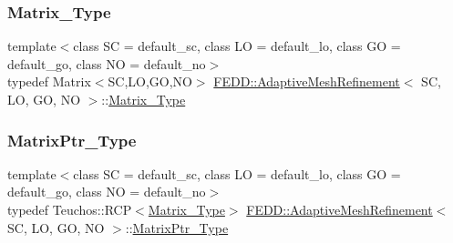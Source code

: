 \mbox{\label{classFEDD_1_1AdaptiveMeshRefinement_a607791df1d84bc4ea9fc08acd31225c7}} 
\subsubsection{\texorpdfstring{Matrix\+\_\+\+Type}{Matrix\_Type}}
{\footnotesize\ttfamily template$<$class SC = default\+\_\+sc, class LO = default\+\_\+lo, class GO = default\+\_\+go, class NO = default\+\_\+no$>$ \\
typedef Matrix$<$SC,LO,GO,NO$>$ \hyperlink{classFEDD_1_1AdaptiveMeshRefinement}{F\+E\+D\+D\+::\+Adaptive\+Mesh\+Refinement}$<$ SC, LO, GO, NO $>$\+::\hyperlink{classFEDD_1_1AdaptiveMeshRefinement_a607791df1d84bc4ea9fc08acd31225c7}{Matrix\+\_\+\+Type}}

\mbox{\label{classFEDD_1_1AdaptiveMeshRefinement_a862a72ab4878d57a61b746f5ac8d0b6c}} 
\subsubsection{\texorpdfstring{Matrix\+Ptr\+\_\+\+Type}{MatrixPtr\_Type}}
{\footnotesize\ttfamily template$<$class SC = default\+\_\+sc, class LO = default\+\_\+lo, class GO = default\+\_\+go, class NO = default\+\_\+no$>$ \\
typedef Teuchos\+::\+R\+CP$<$\hyperlink{classFEDD_1_1AdaptiveMeshRefinement_a607791df1d84bc4ea9fc08acd31225c7}{Matrix\+\_\+\+Type}$>$ \hyperlink{classFEDD_1_1AdaptiveMeshRefinement}{F\+E\+D\+D\+::\+Adaptive\+Mesh\+Refinement}$<$ SC, LO, GO, NO $>$\+::\hyperlink{classFEDD_1_1AdaptiveMeshRefinement_a862a72ab4878d57a61b746f5ac8d0b6c}{Matrix\+Ptr\+\_\+\+Type}}

\mbox{\label{classFEDD_1_1AdaptiveMeshRefinement_a7d24de886f92d012c43fbe13d884f08b}} 
